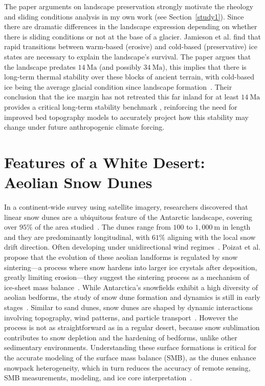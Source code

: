 The paper arguments on landscape preservation strongly motivate the rheology and sliding conditions analysis in my own work (see Section~\ref{study1}). Since there are dramatic differences in the landscape expression depending on whether there is sliding conditions or not at the base of a glacier. Jamieson et al. find that rapid transitions between warm-based (erosive) and cold-based (preservative) ice states are necessary to explain the landscape's survival. The paper argues that the landscape predates $14~\mathrm{Ma}$ (and possibly $34~\mathrm{Ma}$), this implies that there is long-term thermal stability over these blocks of ancient terrain, with cold-based ice being the average glacial condition since landscape formation~\cite{Jamieson_2023}.  Their conclusion that the ice margin has not retreated this far inland for at least $14~\mathrm{Ma}$ provides a critical long-term stability benchmark , reinforcing the need for improved bed topography models to accurately project how this stability may change under future anthropogenic climate forcing.

\section{Features of a White Desert: Aeolian Snow Dunes}
In a continent-wide survey using satellite imagery, researchers discovered that linear snow dunes are a ubiquitous feature of the Antarctic landscape, covering over $95\%$ of the area studied~\cite{Poizat_2024}.
The dunes range from $100$ to $1,000~\mathrm{m}$ in length~\cite{Poizat_2024} and they are predominantly longitudinal, with $61\%$ aligning with the local snow drift direction. Often developing under unidirectional wind regimes~\cite{Poizat_2024}. Poizat et al. propose that the evolution of these aeolian landforms is regulated by snow sintering—a process where snow hardens into larger ice crystals after deposition, greatly limiting erosion—they suggest the  sintering process as a mechanism of ice-sheet mass balance~\cite{Poizat_2024}.
While Antarctica's snowfields exhibit a high diversity of aeolian bedforms, the study of snow dune formation and dynamics is still in early stages~\cite{Poizat_2024}. Similar to sand dunes, snow dunes are shaped by dynamic interactions involving topography, wind patterns, and particle transport~\cite{Poizat_2024}. However the process is not as straightforward as in a regular desert, because snow sublimation contributes to snow depletion and the hardening of bedforms, unlike other sedimentary environments. Understanding these surface formations is critical for the accurate modeling of the surface mass balance (SMB), as the dunes enhance snowpack heterogeneity, which in turn reduces the accuracy of remote sensing, SMB measurements, modeling, and ice core interpretation~\cite{Poizat_2024}.

